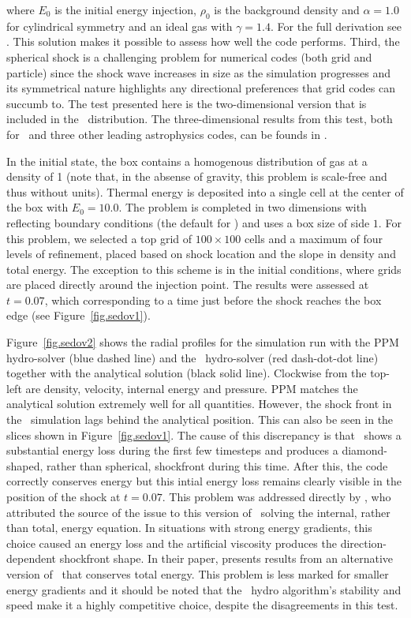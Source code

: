 \noindent where $E_0$ is the initial energy injection, $\rho_0$ is the
background density and $\alpha = 1.0$ for cylindrical symmetry and an
ideal gas with $\gamma = 1.4$. For the full derivation see
\citet{Sedov1959}. This solution makes it possible to assess how well
the code performs.  Third, the spherical shock is a challenging
problem for numerical codes (both grid and particle) since the shock
wave increases in size as the simulation progresses and its
symmetrical nature highlights any directional preferences that grid
codes can succumb to. The test presented here is the two-dimensional
version that is included in the \enzo\ distribution. The
three-dimensional results from this test, both for \enzo\ and three
other leading astrophysics codes, can be founds in \citet{Tasker2008}.

In the initial state, the box contains a homogenous distribution of
gas at a density of 1 (note that, in the absense of gravity, this
problem is scale-free and thus without units). Thermal energy is
deposited into a single cell at the center of the box with $E_0 =
10.0$. The problem is completed in two dimensions with reflecting
boundary conditions (the default for \enzo) and uses a box size of side
$1$. For this problem, we selected a top grid of $100 \times 100$
cells and a maximum of four levels of refinement, placed based on
shock location and the slope in density and total energy. The
exception to this scheme is in the initial conditions, where grids are
placed directly around the injection point. The results were assessed
at $t = 0.07$, which corresponding to a time just before the shock
reaches the box edge (see Figure~\ref{fig.sedov1}).

Figure~\ref{fig.sedov2} shows the radial profiles for the simulation
run with the PPM hydro-solver (blue dashed line) and the \zeus\
hydro-solver (red dash-dot-dot line) together with the analytical
solution (black solid line). Clockwise from the top-left are density,
velocity, internal energy and pressure. PPM matches the analytical
solution extremely well for all quantities. However, the shock front
in the \zeus\ simulation lags behind the analytical position. This can
also be seen in the slices shown in Figure~\ref{fig.sedov1}. The cause
of this discrepancy is that \zeus\ shows a substantial energy loss
during the first few timesteps and produces a diamond-shaped, rather
than spherical, shockfront during this time. After this, the code
correctly conserves energy but this intial energy loss remains clearly
visible in the position of the shock at $t = 0.07$. This problem was
addressed directly by \citet{Clarke2010}, who attributed the source of
the issue to this version of \zeus\ solving the internal, rather than
total, energy equation. In situations with strong energy gradients,
this choice caused an energy loss and the artificial viscosity
produces the direction-dependent shockfront shape. In their paper,
\citet{Clarke2010} presents results from an alternative version of
\zeus\ that conserves total energy. This problem is less marked for
smaller energy gradients and it should be noted that the \zeus\ hydro
algorithm's stability and speed make it a highly competitive choice,
despite the disagreements in this test.


